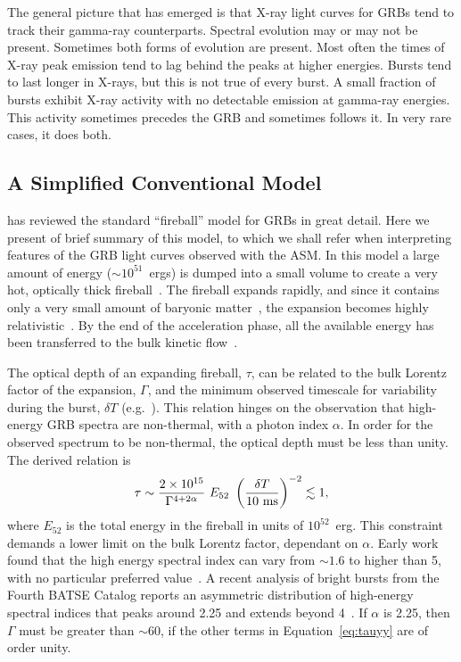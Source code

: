 \documentclass{aastex}
\begin{document}
The general picture that has emerged is that X-ray light curves for
GRBs tend to track their gamma-ray counterparts.  Spectral evolution
may or may not be present.  Sometimes both forms of evolution are
present.  Most often the times of X-ray peak emission tend to lag
behind the peaks at higher energies.  Bursts tend to last longer in
X-rays, but this is not true of every burst.  A small fraction of
bursts exhibit X-ray activity with no detectable emission at gamma-ray
energies.  This activity sometimes precedes the GRB and sometimes
follows it.  In very rare cases, it does both.

\subsection{A Simplified Conventional Model\label{sec:grbmod}}

\citet{piran99} has reviewed the standard ``fireball'' model for GRBs
in great detail.  Here we present of brief summary of this model, to
which we shall refer when interpreting features of the GRB light
curves observed with the ASM.  In this model a large amount of energy
($\sim10^{51}$~ergs) is dumped into a small volume to create a very
hot, optically thick fireball~\citep{goodm86}.  The fireball expands
rapidly, and since it contains only a very small amount of baryonic
matter~\citep{shpi90,kps99}, the expansion becomes highly
relativistic~\citep{blmck76}.  By the end of the acceleration phase,
all the available energy has been transferred to the bulk kinetic
flow~\citep{cavree78}.  

The optical depth of an expanding fireball, $\tau$, can be related to
the bulk Lorentz factor of the expansion, $\Gamma$, and the minimum
observed timescale for variability during the burst, $\delta T$
(e.g.~\citet{piran99}).  This relation hinges on the observation that
high-energy GRB spectra are non-thermal, with a photon index
$\alpha$. In order for the observed spectrum to be non-thermal, the
optical depth must be less than unity.  The derived relation is
\begin{equation}
\label{eq:tauyy}
\tau \sim \frac{2\times10^{15}}{\Gamma^{4+2\alpha}}\ E_{52}\ 
\left( \frac{\delta T}{10\ {\rm ms}} \right)^{-2} \lesssim 1,
\end{equation}
where $E_{52}$ is the total energy in the fireball in units of
$10^{52}$~erg. This constraint demands a lower limit on the bulk
Lorentz factor, dependant on $\alpha$.  Early work found that the high
energy spectral index can vary from $\sim1.6$ to higher than 5, with
no particular preferred value~\citep{bmfsp93}.  A recent analysis of
bright bursts from the Fourth BATSE Catalog reports an asymmetric
distribution of high-energy spectral indices that peaks around 2.25
and extends beyond 4~\citep{pbmpp00}.  If $\alpha$ is 2.25, then
$\Gamma$ must be greater than $\sim60$, if the other terms in
Equation~\ref{eq:tauyy} are of order unity.
\end{document}
